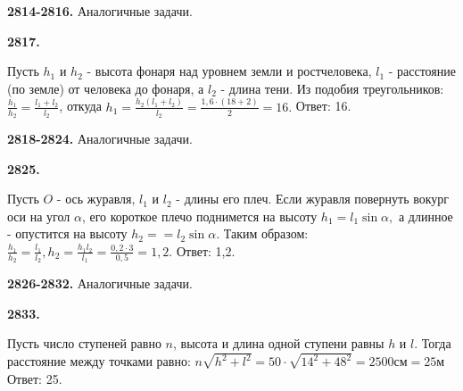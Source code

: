\textbf{2814-2816.} Аналогичные задачи.

\textbf{2817.}
\begin{figure}[h]
\end{figure}
Пусть $h_1$ и $h_2$ - высота фонаря над уровнем земли и рост\newline человека, $l_1$ - расстояние (по земле) от человека до фонаря, а $l_2$ - длина тени. Из подобия треугольников:
$\frac{h_1}{h_2}=\frac{l_1+l_2}{l_2}$, откуда $h_1=\frac{h_2(l_1+l_2)}{l_2}=\frac{1,6\cdot(18+2)}{2}=16.$ \newline \null \hspace*{\fill} Ответ: 16. 

\textbf{2818-2824.} Аналогичные задачи.

\textbf{2825.}
\begin{figure}[h]
\end{figure}

Пусть $O$ - ось журавля, $l_1$ и $l_2$ - длины его плеч. Если журавля повернуть вокург оси на угол $\alpha$, его короткое плечо поднимется на высоту $h_1=l_1\sin\alpha,$ а длинное - опустится на высоту $h_2=$\newline$=l_2\sin\alpha.$ Таким образом:
$\frac{h_1}{h_2}=\frac{l_1}{l_2}, h_2=\frac{h_1l_2}{l_1}=\frac{0,2\cdot3}{0,5}=1,2.$ \newline \null \hspace*{\fill} Ответ: 1,2. 

\textbf{2826-2832.} Аналогичные задачи.

\textbf{2833.} 
\begin{figure}[h]
\end{figure}
Пусть число ступеней равно $n$, высота и длина одной ступени равны $h$ и $l$. Тогда расстояние между точками равно:\newline
$n\sqrt{h^2+l^2}=50\cdot\sqrt{14^2+48^2}=2500\text{см}=25\text{м}$ \newline \null \hspace*{\fill} Ответ: 25. 


